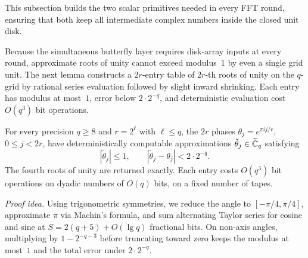 This subsection builds the two scalar primitives needed in every FFT round, ensuring that both keep all intermediate
complex numbers inside the closed unit disk.

Because the simultaneous butterfly layer requires disk-array inputs at every round, approximate roots of unity cannot
exceed modulus~$1$ by even a single grid unit. The next lemma constructs a $2r$-entry table of $2r$-th roots of unity on
the $q$-grid by rational series evaluation followed by slight inward shrinking. Each entry has modulus at most~$1$,
error below $2\cdot 2^{-q}$, and deterministic evaluation cost $O(q^3)$ bit operations.

\begin{lemma}\label{lem:phase-table}
For every precision $q\ge8$ and $r=2^\ell$ with $\ell\le q$, the $2r$ phases $\theta_j=e^{\pi ij/r}$, $0\le j<2r$, have
deterministically computable approximations $\tilde\theta_j\in\widetilde{\mathbb{C}}_q$ satisfying
\[
  |\tilde\theta_j|\le1,\qquad |\tilde\theta_j-\theta_j|<2\cdot2^{-q}.
\]
The fourth roots of unity are returned exactly. Each entry costs $O(q^3)$ bit operations on dyadic numbers of $O(q)$
bits, on a fixed number of tapes.
\end{lemma}

\emph{Proof idea.} Using trigonometric symmetries, we reduce the angle to $[-\pi/4,\pi/4]$, approximate $\pi$ via
Machin's formula, and sum alternating Taylor series for cosine and sine at $S=2(q+5)+O(\lg q)$ fractional bits.
On non-axis angles, multiplying by $1-2^{-q-3}$ before truncating toward zero keeps the modulus at most~$1$ and the
total error under $2\cdot 2^{-q}$.

